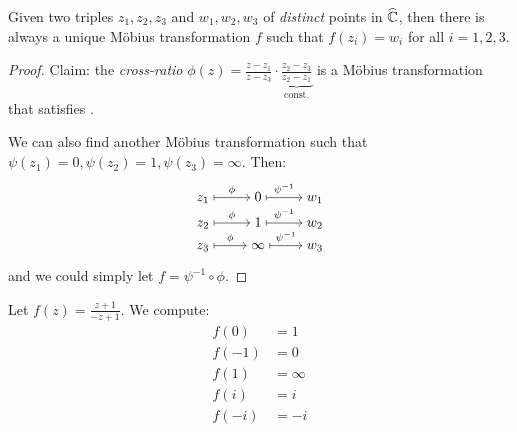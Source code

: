 \documentclass[12pt]{article}
\begin{document}
\begin{theorem}
    Given two triples $z_1,z_2,z_3$ and $w_1,w_2,w_3$ of \textit{distinct} points in $\widehat{\mathbb{C}}$, then there is always a unique Möbius transformation $f$ such that $f(z_i)=w_i$ for all $i=1,2,3$.
\end{theorem}
\begin{proof}
    Claim: the \textit{cross-ratio} $\phi(z)=\frac{z-z_1}{z-z_3}\cdot \underset{\text{const.}}{\underbrace{\frac{z_2-z_3}{z_2-z_1}}}$ is a Möbius transformation that satisfies .

    We can also find another Möbius transformation such that $\psi(z_1)=0, \psi(z_2)=1, \psi(z_3)=\infty$. Then:
    \[\begin{tikzcd}[ampersand replacement=\&,cramped,row sep=tiny]
        {z_1} \& 0 \& {w_1} \\
        {z_2} \& 1 \& {w_2} \\
        {z_3} \& \infty \& {w_3}
        \arrow["\phi", maps to, from=1-1, to=1-2]
        \arrow["{\psi^{-1}}", maps to, from=1-2, to=1-3]
        \arrow["\phi", maps to, from=2-1, to=2-2]
        \arrow["{\psi^{-1}}", maps to, from=2-2, to=2-3]
        \arrow["\phi", maps to, from=3-1, to=3-2]
        \arrow["{\psi^{-1}}", maps to, from=3-2, to=3-3]
    \end{tikzcd}\]

    and we could simply let $f=\psi^{-1}\circ \phi$.
\end{proof}

\eg Let $f(z)=\frac{z+1}{-z+1}$. We compute:\begin{align*}
    f(0)&=1\\
    f(-1)&=0\\
    f(1)&=\infty\\
    f(i)&=i\\
    f(-i)&=-i\\
\end{align*}
\end{document}
